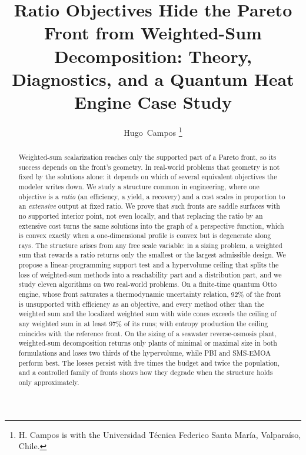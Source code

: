 \documentclass[journal]{IEEEtran}
\theoremstyle{remark}
\begin{document}
\title{Ratio Objectives Hide the Pareto Front from Weighted-Sum Decomposition: Theory, Diagnostics,
and a Quantum Heat Engine Case Study}

\author{Hugo~Campos%
\thanks{H. Campos is with the Universidad T\'ecnica Federico Santa Mar\'ia, Valpara\'iso, Chile.}}


\maketitle

\begin{abstract}
Weighted-sum scalarization reaches only the supported part of a Pareto front, so its success depends
on the front's geometry. In real-world problems that geometry is not fixed by the solutions alone:
it depends on which of several equivalent objectives the modeler writes down. We study a structure
common in engineering, where one objective is a \emph{ratio} (an efficiency, a yield, a recovery) and a
cost scales in proportion to an \emph{extensive} output at fixed ratio. We prove that such fronts are
saddle surfaces with no supported interior point, not even locally, and that replacing the ratio by an
extensive cost turns the same solutions into the graph of a perspective function, which is convex
exactly when a one-dimensional profile is convex but is degenerate along rays. The structure arises
from any free scale variable: in a sizing problem, a weighted sum that rewards a ratio returns only the
smallest or the largest admissible design. We propose a linear-programming support test and a
hypervolume ceiling that splits the loss of weighted-sum methods into a reachability part and a
distribution part, and we study eleven algorithms on two real-world problems. On a finite-time quantum
Otto engine, whose front saturates a thermodynamic uncertainty relation, 92\% of the front is
unsupported with efficiency as an objective, and every method other than the weighted sum and the localized
weighted sum with wide cones exceeds the ceiling of any weighted sum in at least 97\% of its runs; with entropy production the ceiling coincides with
the reference front. On the sizing of a seawater reverse-osmosis plant, weighted-sum decomposition
returns only plants of minimal or maximal size in both formulations and loses two thirds of the
hypervolume, while PBI and SMS-EMOA perform best. The losses persist with five times the budget and twice the
population, and a controlled family of fronts shows how they degrade when the structure holds only
approximately.
\end{abstract}
\end{document}
